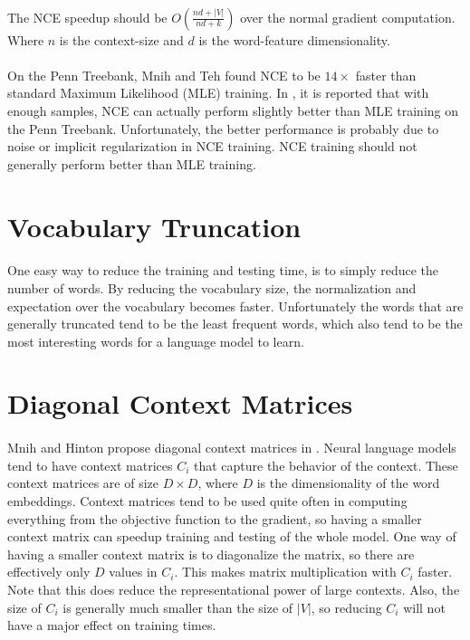 \paragraph{}
The NCE speedup should be $O(\frac{nd + |V|} {nd+ k})$ over the normal gradient computation. Where $n$ is the context-size and $d$ is the word-feature dimensionality.
\paragraph{}
On the Penn Treebank, Mnih and Teh found NCE to be $14\times$ faster than standard Maximum Likelihood (MLE)  training. In \cite{MnihTeh2012}, it is reported that with enough samples, NCE can actually perform slightly better than MLE training on the Penn Treebank. Unfortunately, the better performance is probably due to noise or implicit regularization in NCE training. NCE training should not generally perform better than MLE training.


\section{Vocabulary Truncation}
\paragraph{}
One easy way to reduce the training and testing time, is to simply reduce the number of words. By reducing the vocabulary size, the normalization and expectation over the vocabulary becomes faster. Unfortunately the words that are generally truncated tend to be the least frequent words, which also tend to be the most interesting words for a language model to learn.

\section{Diagonal Context Matrices}
\paragraph{}
Mnih and Hinton propose diagonal context matrices in \cite{MnihHinton2009}. Neural language models tend to have context matrices $C_i$ that capture the behavior of the context. These context matrices are of size $D \times D$, where $D$ is the dimensionality of the word embeddings. Context matrices tend to be used quite often in computing everything from the objective function to the gradient, so having a smaller context matrix can speedup training and testing of the whole model. One way of having a smaller context matrix is to diagonalize the matrix, so there are effectively only $D$ values in $C_i$. This makes matrix multiplication with $C_i$ faster. Note that this does reduce the representational power of large contexts. Also, the size of $C_i$ is generally much smaller than the size of $|V|$, so reducing $C_i$ will not have a major effect on training times.

